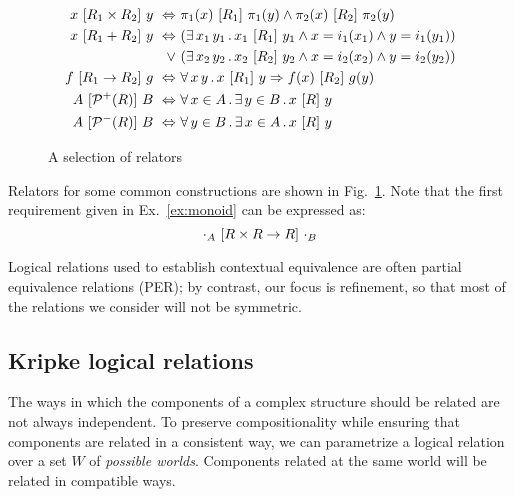 \begin{figure} %
  {\small
  \begin{align*}
    x \ [{R_1 \times R_2}]\  y \ \Leftrightarrow\  &
      \pi_1(x) \ [{R_1}]\  \pi_1(y) \wedge
      \pi_2(x) \ [{R_2}]\  \pi_2(y) \\
    x \ [{R_1 + R_2}]\  y \ \Leftrightarrow\  &
      (\exists \, x_1 \, y_1 \,.\,
        x_1 \ [{R_1}]\  y_1 \wedge
        x = i_1(x_1) \wedge
        y = i_1(y_1)) \\ \vee\ &
      (\exists \, x_2 \, y_2 \,.\,
        x_2 \ [{R_2}]\  y_2 \wedge
        x = i_2(x_2) \wedge
        y = i_2(y_2)) \\
    f \ [{R_1 \rightarrow R_2}]\  g \ \Leftrightarrow\  &
      \forall \, x \, y \,.\,
        x \ [{R_1}]\  y \Rightarrow
        f(x) \ [{R_2}]\  g(y) \\
    A \ [{\mathcal{P}^+(R)}]\  B \ \Leftrightarrow\  &
      \forall \, x \in A \,.\,
      \exists \, y \in B \,.\,
      x \ [{R}]\  y \\
    A \ [{\mathcal{P}^-(R)}]\  B \ \Leftrightarrow\  &
      \forall \, y \in B \,.\,
      \exists \, x \in A \,.\,
      x \ [{R}]\  y
  \end{align*}
  }%
  \caption{A selection of relators}
  \label{fig:relators}
\end{figure}

Relators for some common constructions are shown in Fig.~\ref{fig:relators}.
Note that the first requirement given in Ex.~\ref{ex:monoid}
can be expressed as:
\[
  \cdot_A \ [{R \times R \rightarrow R}]\  \cdot_B
\]

Logical relations used to establish contextual equivalence
are often partial equivalence relations (PER);
by contrast, our focus is refinement,
so that most of the relations we consider will not be symmetric.


\subsection{Kripke logical relations} %
\label{sec:klr}

The ways in which the components of a complex structure should be related
are not always independent.
To preserve compositionality while ensuring that
components are related in a consistent way,
we can parametrize a logical relation
over a set $W$ of \emph{possible worlds}.
Components related at the same world will be related
in compatible ways.

